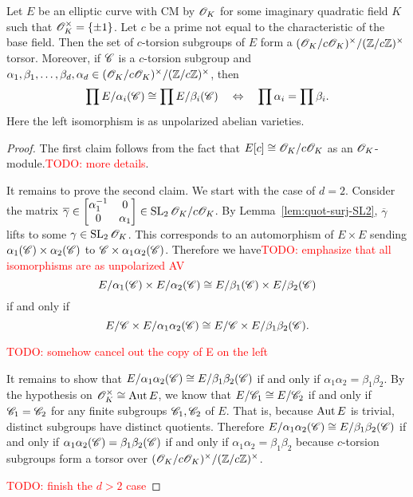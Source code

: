 \documentclass{amsart}
\begin{document}
\begin{lemma}
  Let $E$ be an elliptic curve with CM by $\mathscr{O}_K$ for some imaginary quadratic field $K$ such that $\mathscr{O}_K^\times = \{\pm 1\}$. Let $c$ be a prime not equal to the characteristic of the base field. Then the set of $c$-torsion subgroups of $E$ form a $(\mathscr{O}_K/c\mathscr{O}_K)^\times/(\mathbb{Z}/c\mathbb{Z})^\times$ torsor. Moreover, if $\mathscr{C}$ is a $c$-torsion subgroup and $\alpha_1,\beta_1,\dots,\beta_d,\alpha_d \in (\mathscr{O}_K/c\mathscr{O}_K)^\times/(\mathbb{Z}/c\mathbb{Z})^\times$, then
  \[
    \prod E/\alpha_i(\mathscr{C})
    \cong
    \prod E/\beta_i(\mathscr{C})
    \quad\Leftrightarrow\quad
    \prod \alpha_i = \prod \beta_i.
  \]
  Here the left isomorphism is as unpolarized abelian varieties.
\end{lemma}
\begin{proof}
  The first claim follows from the fact that $E[c] \cong \mathscr{O}_K/c\mathscr{O}_K$ as an $\mathscr{O}_K$-module.\textcolor{red}{TODO: more details}.

  It remains to prove the second claim. We start with the case of $d = 2$. Consider the matrix $\overline{\gamma} \in \begin{bmatrix} \alpha_1^{-1} & 0 \\ 0 & \alpha_1 \end{bmatrix} \in \operatorname{SL}_2{\mathscr{O}_K/c\mathscr{O}_K}$. By Lemma~\ref{lem:quot-surj-SL2}, $\overline{\gamma}$ lifts to some $\gamma \in \operatorname{SL}_2{\mathscr{O}_K}$. This corresponds to an automorphism of $E \times E$ sending $\alpha_1(\mathscr{C}) \times \alpha_2(\mathscr{C})$ to $\mathscr{C} \times \alpha_1\alpha_2(\mathscr{C})$. Therefore we have\textcolor{red}{TODO: emphasize that all isomorphisms are as unpolarized AV}
  \[
    E/\alpha_1(\mathscr{C}) \times E/\alpha_2(\mathscr{C})
    \cong
    E/\beta_1(\mathscr{C}) \times E/\beta_2(\mathscr{C})
  \]
  if and only if
  \[
    E/\mathscr{C} \times E/\alpha_1\alpha_2(\mathscr{C})
    \cong
    E/\mathscr{C} \times E/\beta_1\beta_2(\mathscr{C}).
  \]

  \textcolor{red}{TODO: somehow cancel out the copy of E on the left}

  It remains to show that $E/\alpha_1\alpha_2(\mathscr{C}) \cong E/\beta_1\beta_2(\mathscr{C})$ if and only if $\alpha_1\alpha_2 = \beta_1\beta_2$. By the hypothesis on $\mathscr{O}_K^\times \cong \operatorname{Aut} E$, we know that $E/\mathscr{C}_1 \cong E/\mathscr{C}_2$ if and only if $\mathscr{C}_1 = \mathscr{C}_2$ for any finite subgroups $\mathscr{C}_1,\mathscr{C}_2$ of $E$. That is, because $\operatorname{Aut} E$ is trivial, distinct subgroups have distinct quotients. Therefore $E/\alpha_1\alpha_2(\mathscr{C}) \cong E/\beta_1\beta_2(\mathscr{C})$ if and only if $\alpha_1\alpha_2(\mathscr{C}) = \beta_1\beta_2(\mathscr{C})$ if and only if $\alpha_1\alpha_2 = \beta_1\beta_2$ because $c$-torsion subgroups form a torsor over $(\mathscr{O}_K/c\mathscr{O}_K)^\times/(\mathbb{Z}/c\mathbb{Z})^\times$.

  \textcolor{red}{TODO: finish the $d > 2$ case}
\end{proof}
\end{document}
